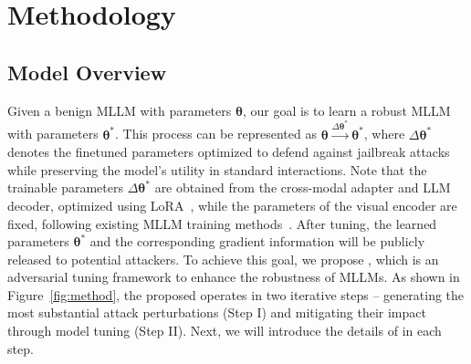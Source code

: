 




\section{Methodology}\label{sec:method}
\subsection{Model Overview}
Given a benign MLLM with parameters $\boldsymbol\theta$, our goal is to learn a robust MLLM with parameters $\boldsymbol\theta^{*}$. This process can be represented as $\boldsymbol{\theta} \xrightarrow{\Delta\boldsymbol\theta^{*}} \boldsymbol{\theta}^{*}$, where $\Delta\boldsymbol\theta^*$ denotes the finetuned parameters optimized to defend against jailbreak attacks while preserving the model's utility in standard interactions.  
Note that the trainable parameters $\Delta\boldsymbol\theta^*$ are obtained from the cross-modal adapter and LLM decoder, optimized using LoRA~\citep{hu2021lora}, while the parameters of the visual encoder are fixed, following existing MLLM training methods~\citep{liu2024visual,dai2023instructblip}. 
After tuning, the learned parameters $\boldsymbol\theta^*$ and the corresponding gradient information will be publicly released to potential attackers. To achieve this goal, we propose {\name}, which is an adversarial tuning framework to enhance the robustness of MLLMs.
As shown in Figure~\ref{fig:method}, the proposed {\name} operates in two iterative steps -- generating the most substantial attack perturbations (Step I) and mitigating their impact through model tuning (Step II).
Next, we will introduce the details of {\name} in each step.

